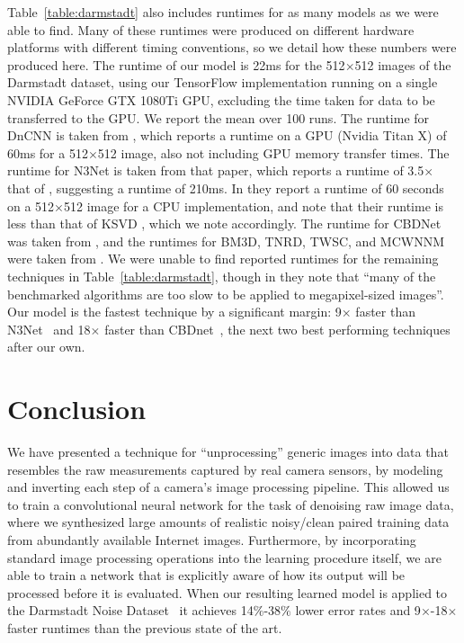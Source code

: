 \documentclass[10pt,twocolumn,letterpaper]{article}
\begin{document}
Table~\ref{table:darmstadt} also includes runtimes for as many models as we were able to find. Many of these runtimes were produced on different hardware platforms with different timing conventions, so we detail how these numbers were produced here.
The runtime of our model is 22ms for the 512$\times$512 images of the Darmstadt dataset, using our TensorFlow implementation running on a single NVIDIA GeForce GTX 1080Ti GPU, excluding the time taken for data to be transferred to the GPU. We report the mean over 100 runs.
The runtime for DnCNN is taken from \cite{Zhang2017}, which reports a runtime on a GPU (Nvidia Titan X) of 60ms for a 512$\times$512 image, also not including GPU memory transfer times.
The runtime for N3Net \cite{NNN} is taken from that paper, which reports a runtime of 3.5$\times$ that of \cite{Zhang2017}, suggesting a runtime of 210ms.
In \cite{MLP} they report a runtime of 60 seconds on a 512$\times$512 image for a CPU implementation, and note that their runtime is less than that of KSVD \cite{KSVD}, which we note accordingly.
The runtime for CBDNet was taken from \cite{CBDnet}, and the runtimes for BM3D, TNRD, TWSC, and MCWNNM were taken from \cite{TWSC}.
We were unable to find reported runtimes for the remaining techniques in Table~\ref{table:darmstadt}, though in \cite{plotz2017cvpr} they note that  ``many of the benchmarked algorithms are too slow to be applied to megapixel-sized images''.
Our model is the fastest technique by a significant margin: 9$\times$ faster than N3Net~\cite{NNN} and 18$\times$ faster than CBDnet~\cite{CBDnet}, the next two best performing techniques after our own.

\section{Conclusion}

We have presented a technique for ``unprocessing'' generic images into 
data that resembles the raw measurements captured by real camera sensors, by modeling and inverting each step of a camera's image processing pipeline.
This allowed us to train a convolutional neural network for the task of denoising raw image data, where we synthesized large amounts of realistic noisy/clean paired training data from abundantly available Internet images.
Furthermore, by incorporating standard image processing operations into the learning procedure itself, we are able to train a network that is explicitly aware of how its output will be processed before it is evaluated.
When our resulting learned model is applied to the Darmstadt Noise Dataset~\cite{plotz2017cvpr} it achieves 14$\%$-38$\%$ lower error rates and 9$\times$-18$\times$ faster runtimes than the previous state of the art.

{\small


}
\end{document}

